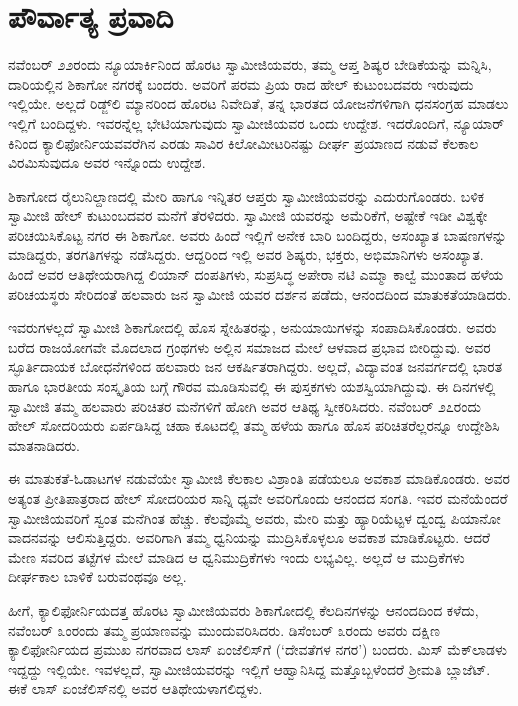 
\chapter{ಪೌರ್ವಾತ್ಯ ಪ್ರವಾದಿ}

\noindent

ನವೆಂಬರ್ ೨೨ರಂದು ನ್ಯೂಯಾರ್ಕಿನಿಂದ ಹೊರಟ ಸ್ವಾಮೀಜಿಯವರು, ತಮ್ಮ ಆಪ್ತ ಶಿಷ್ಯರ ಬೇಡಿಕೆಯನ್ನು ಮನ್ನಿಸಿ, ದಾರಿಯಲ್ಲಿನ ಶಿಕಾಗೋ ನಗರಕ್ಕೆ ಬಂದರು. ಅವರಿಗೆ ಪರಮ ಪ್ರಿಯ ರಾದ ಹೇಲ್ ಕುಟುಂಬದವರು ಇರುವುದು ಇಲ್ಲಿಯೇ. ಅಲ್ಲದೆ ರಿಡ್ಜ್​ಲಿ ಮ್ಯಾನರಿಂದ ಹೊರಟ ನಿವೇದಿತೆ, ತನ್ನ ಭಾರತದ ಯೋಜನೆಗಳಿಗಾಗಿ ಧನಸಂಗ್ರಹ ಮಾಡಲು ಇಲ್ಲಿಗೆ ಬಂದಿದ್ದಳು. ಇವರನ್ನೆಲ್ಲ ಭೇಟಿಯಾಗುವುದು ಸ್ವಾಮೀಜಿಯವರ ಒಂದು ಉದ್ದೇಶ. ಇದರೊಂದಿಗೆ, ನ್ಯೂಯಾರ್ ಕಿನಿಂದ ಕ್ಯಾಲಿಫೋರ್ನಿಯವವರೆಗಿನ ಎರಡು ಸಾವಿರ ಕಿಲೋಮೀಟರಿನಷ್ಟು ದೀರ್ಘ ಪ್ರಯಾಣದ ನಡುವೆ ಕೆಲಕಾಲ ವಿರಮಿಸುವುದೂ ಅವರ ಇನ್ನೊಂದು ಉದ್ದೇಶ.

ಶಿಕಾಗೋದ ರೈಲುನಿಲ್ದಾಣದಲ್ಲಿ ಮೇರಿ ಹಾಗೂ ಇನ್ನಿತರ ಆಪ್ತರು ಸ್ವಾಮೀಜಿಯವರನ್ನು ಎದುರುಗೊಂಡರು. ಬಳಿಕ ಸ್ವಾಮೀಜಿ ಹೇಲ್ ಕುಟುಂಬದವರ ಮನೆಗೆ ತೆರಳಿದರು. ಸ್ವಾಮೀಜಿ ಯವರನ್ನು ಅಮೆರಿಕೆಗೆ, ಅಷ್ಟೇಕೆ ಇಡೀ ವಿಶ್ವಕ್ಕೇ ಪರಿಚಯಿಸಿಕೊಟ್ಟ ನಗರ ಈ ಶಿಕಾಗೋ. ಅವರು ಹಿಂದೆ ಇಲ್ಲಿಗೆ ಅನೇಕ ಬಾರಿ ಬಂದಿದ್ದರು, ಅಸಂಖ್ಯಾತ ಬಾಷಣಗಳನ್ನು ಮಾಡಿದ್ದರು, ತರಗತಿಗಳನ್ನು ನಡೆಸಿದ್ದರು. ಆದ್ದರಿಂದ ಇಲ್ಲಿ ಅವರ ಶಿಷ್ಯರು, ಭಕ್ತರು, ಅಭಿಮಾನಿಗಳು ಅಸಂಖ್ಯಾತ. ಹಿಂದೆ ಅವರ ಆತಿಥೇಯರಾಗಿದ್ದ ಲಿಯಾನ್ ದಂಪತಿಗಳು, ಸುಪ್ರಸಿದ್ಧ ಅಪೇರಾ ನಟಿ ಎಮ್ಮಾ ಕಾಲ್ವೆ ಮುಂತಾದ ಹಳೆಯ ಪರಿಚಯಸ್ಥರು ಸೇರಿದಂತೆ ಹಲವಾರು ಜನ ಸ್ವಾಮೀಜಿ ಯವರ ದರ್ಶನ ಪಡೆದು, ಆನಂದದಿಂದ ಮಾತುಕತೆಯಾಡಿದರು.

ಇವರುಗಳಲ್ಲದೆ ಸ್ವಾಮೀಜಿ ಶಿಕಾಗೋದಲ್ಲಿ ಹೊಸ ಸ್ನೇಹಿತರನ್ನು, ಅನುಯಾಯಿಗಳನ್ನು ಸಂಪಾದಿಸಿಕೊಂಡರು. ಅವರು ಬರೆದ ರಾಜಯೋಗವೇ ಮೊದಲಾದ ಗ್ರಂಥಗಳು ಅಲ್ಲಿನ ಸಮಾಜದ ಮೇಲೆ ಆಳವಾದ ಪ್ರಭಾವ ಬೀರಿದ್ದುವು. ಅವರ ಸ್ಫೂರ್ತಿದಾಯಕ ಬೋಧನೆಗಳಿಂದ ಹಲವಾರು ಜನ ಆಕರ್ಷಿತರಾಗಿದ್ದರು. ಅಲ್ಲದೆ, ವಿದ್ಯಾವಂತ ಜನವರ್ಗದಲ್ಲಿ ಭಾರತ ಹಾಗೂ ಭಾರತೀಯ ಸಂಸ್ಕೃತಿಯ ಬಗ್ಗೆ ಗೌರವ ಮೂಡಿಸುವಲ್ಲಿ ಈ ಪುಸ್ತಕಗಳು ಯಶಸ್ವಿಯಾಗಿದ್ದುವು. ಈ ದಿನಗಳಲ್ಲಿ ಸ್ವಾಮೀಜಿ ತಮ್ಮ ಹಲವಾರು ಪರಿಚಿತರ ಮನೆಗಳಿಗೆ ಹೋಗಿ ಅವರ ಆತಿಥ್ಯ ಸ್ವೀಕರಿಸಿದರು. ನವೆಂಬರ್ ೨೭ರಂದು ಹೇಲ್ ಸೋದರಿಯರು ಏರ್ಪಡಿಸಿದ್ದ ಚಹಾ ಕೂಟದಲ್ಲಿ ತಮ್ಮ ಹಳೆಯ ಹಾಗೂ ಹೊಸ ಪರಿಚಿತರೆಲ್ಲರನ್ನೂ ಉದ್ದೇಶಿಸಿ ಮಾತನಾಡಿದರು.

ಈ ಮಾತುಕತೆ-ಓಡಾಟಗಳ ನಡುವೆಯೇ ಸ್ವಾಮೀಜಿ ಕೆಲಕಾಲ ವಿಶ್ರಾಂತಿ ಪಡೆಯಲೂ ಅವಕಾಶ ಮಾಡಿಕೊಂಡರು. ಅವರ ಅತ್ಯಂತ ಪ್ರೀತಿಪಾತ್ರರಾದ ಹೇಲ್ ಸೋದರಿಯರ ಸಾನ್ನಿ ಧ್ಯವೇ ಅವರಿಗೊಂದು ಆನಂದದ ಸಂಗತಿ. ಇವರ ಮನೆಯೆಂದರೆ ಸ್ವಾಮೀಜಿಯವರಿಗೆ ಸ್ವಂತ ಮನೆಗಿಂತ ಹೆಚ್ಚು. ಕೆಲವೊಮ್ಮೆ ಅವರು, ಮೇರಿ ಮತ್ತು ಹ್ಯಾರಿಯೆಟ್ಟಳ ದ್ವಂದ್ವ ಪಿಯಾನೋ ವಾದನವನ್ನು ಆಲಿಸುತ್ತಿದ್ದರು. ಅವರಿಗಾಗಿ ತಮ್ಮ ಧ್ವನಿಯನ್ನು ಮುದ್ರಿಸಿಕೊಳ್ಳಲೂ ಅವಕಾಶ ಮಾಡಿಕೊಟ್ಟರು. ಆದರೆ ಮೇಣ ಸವರಿದ ತಟ್ಟೆಗಳ ಮೇಲೆ ಮಾಡಿದ ಆ ಧ್ವನಿಮುದ್ರಿಕೆಗಳು ಇಂದು ಲಭ್ಯವಿಲ್ಲ. ಅಲ್ಲದೆ ಆ ಮುದ್ರಿಕೆಗಳು ದೀರ್ಘಕಾಲ ಬಾಳಿಕೆ ಬರುವಂಥವೂ ಅಲ್ಲ.

ಹೀಗೆ, ಕ್ಯಾಲಿಫೋರ್ನಿಯದತ್ತ ಹೊರಟ ಸ್ವಾಮೀಜಿಯವರು ಶಿಕಾಗೋದಲ್ಲಿ ಕೆಲದಿನಗಳನ್ನು ಆನಂದದಿಂದ ಕಳೆದು, ನವೆಂಬರ್ ೩ಂರಂದು ತಮ್ಮ ಪ್ರಯಾಣವನ್ನು ಮುಂದುವರಿಸಿದರು. ಡಿಸೆಂಬರ್ ೩ರಂದು ಅವರು ದಕ್ಷಿಣ ಕ್ಯಾಲಿಫೋರ್ನಿಯದ ಪ್ರಮುಖ ನಗರವಾದ ಲಾಸ್ ಏಂಜೆಲಿಸ್​ಗೆ (‘ದೇವತೆಗಳ ನಗರ’) ಬಂದರು. ಮಿಸ್ ಮೆಕ್​ಲಾಡಳು ಇದ್ದದ್ದು ಇಲ್ಲಿಯೇ. ಇವಳಲ್ಲದೆ, ಸ್ವಾಮೀಜಿಯವರನ್ನು ಇಲ್ಲಿಗೆ ಆಹ್ವಾನಿಸಿದ್ದ ಮತ್ತೊಬ್ಬಳೆಂದರೆ ಶ್ರೀಮತಿ ಬ್ಲಾಜೆಟ್. ಈಕೆ ಲಾಸ್ ಏಂಜೆಲಿಸ್​ನಲ್ಲಿ ಅವರ ಆತಿಥೇಯಳಾಗಲಿದ್ದಳು.

